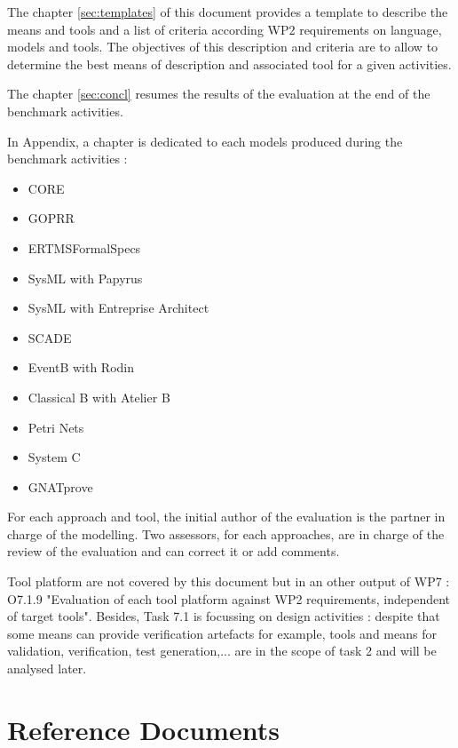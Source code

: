 The chapter \ref{sec:templates} of this document provides a template to describe the means and tools and a list of criteria according WP2 requirements on language, models and tools. The objectives of this description and criteria are to allow to determine the best means of description and associated tool for a given activities.

The chapter \ref{sec:concl} resumes the results of the evaluation at the end of the benchmark activities.

In Appendix, a chapter is dedicated to each models produced during the benchmark activities :
\begin{itemize}
\item  CORE
\item  GOPRR
\item  ERTMSFormalSpecs
\item  SysML with Papyrus
\item  SysML with Entreprise Architect
\item  SCADE
\item  EventB with Rodin
\item  Classical B with Atelier B
\item  Petri Nets
\item  System C
\item  GNATprove
\end{itemize}

For each approach and tool, the initial  author of the evaluation is the partner in charge of the modelling. Two assessors, for each approaches,  are in charge of the review of the evaluation and can correct it or add comments.

Tool platform are not covered by this document but in an other output of WP7 :  O7.1.9 "Evaluation of each tool platform against WP2 requirements, independent of target tools".
Besides, Task 7.1 is focussing on design activities : despite that some means can provide verification artefacts for example,  tools and means for validation, verification, test generation,... are in the scope of task 2 and will be analysed later.



\section{Reference Documents}
\label{sec:ref}

